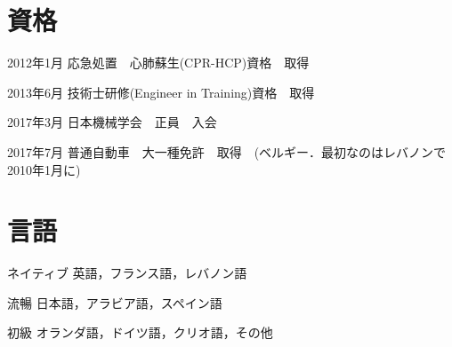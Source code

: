 \documentclass[10pt, a4paper]{article}
\begin{document}
\section{資格}
\begin{lonelist}
\item[2012年1月] 応急処置　心肺蘇生(CPR-HCP)資格　取得
\item[2013年6月] 技術士研修(Engineer in Training)資格　取得
\item[2017年3月] 日本機械学会　正員　入会
\item[2017年7月] 普通自動車　大一種免許　取得　(ベルギー．最初なのはレバノンで2010年1月に)
\end{lonelist}

\section{言語}
\begin{lonelist}
\item[ネイティブ] 英語，フランス語，レバノン語
\item[流暢] 日本語，アラビア語，スペイン語
\item[初級] オランダ語，ドイツ語，クリオ語，その他
\end{lonelist}

\end{document}
